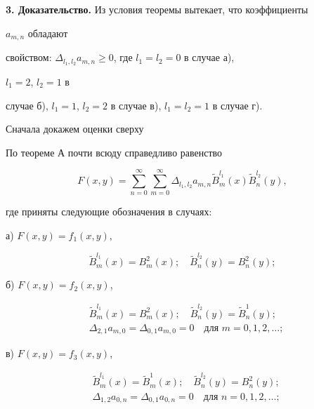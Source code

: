 \medskip


 


{\bf 3. Доказательство.} Из условия теоремы вытекает, что коэффициенты 


$a_{m,n}$ обладают 


свойством: $\Delta_{l_1,l_2}a_{m,n}\ge0$, где $l_1=l_2=0$ в случае а), 


$l_1=2$, $l_2=1$ в 


случае б), $l_1=1$, $l_2=2$ в случае в), $l_1=l_2=1$ в случае г). 


 


Сначала докажем оценки сверху 


 


По теореме А почти всюду справедливо равенство 


\begin{equation} 


F(x,y)=\sum^\infty_{n=0}\sum^\infty_{m=0}\Delta_{l_1,l_2}a_{m,n} 


\widetilde B_m^{l_1}(x)\widetilde B_n^{l_2}(y),\tag{3} 


\end{equation} 


где приняты следующие обозначения в случаях: 


 


\noindent а) $F(x,y)=f_1(x,y),$ 


$$ 


\widetilde B_m^{l_1}(x)=B_m^2(x);\quad 


\widetilde B_n^{l_2}(y)=B_n^2(y); 


$$ 


б) $F(x,y)=f_2(x,y)$, 


\begin{align*} 


&\widetilde B_m^{l_1}(x)=B_m^2(x);\quad 


\widetilde B_n^{l_2}(y)=\widetilde B_n^1(y);\\ 


&\Delta_{2,1}a_{m,0}=\Delta_{0,1}a_{m,0}=0\quad\text{для }m=0,1,2,\dotsc; 


\end{align*} 


в) $F(x,y)=f_3(x,y)$,


\begin{align*} 


&\widetilde B_m^{l_1}(x)=\widetilde B_m^1(x);\quad 


\widetilde B_n^{l_2}(y)=B_n^2(y);\\ 


&\Delta_{1,2}a_{0,n}=\Delta_{0,1}a_{0,n}=0\quad\text{для }n=0,1,2,\dotsc; 


\end{align*} 


